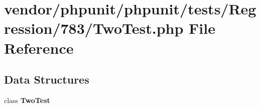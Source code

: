 \section{vendor/phpunit/phpunit/tests/\+Regression/783/\+Two\+Test.php File Reference}
\label{_two_test_8php}
\subsection*{Data Structures}
\begin{DoxyCompactItemize}
\item 
class {\bf Two\+Test}
\end{DoxyCompactItemize}
